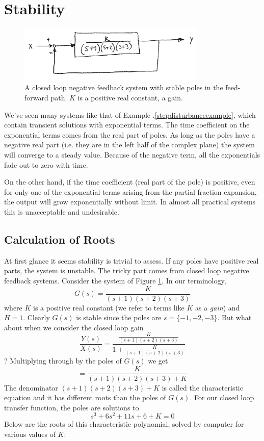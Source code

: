 \section{Stability}\label{FeedbackStabilitySection}


\begin{figure}\centering
\includegraphics[width=3.5in]{figs06/00779a.png}
\caption{A closed loop negative feedback system with stable poles in the feed-forward path. $K$ is a positive real constant, a gain.}\label{openloopstable}
\end{figure}

We've seen many systems like that of Example \thechapter.\ref{stepdisturbanceexample}, which contain transient solutions with exponential terms.
The time coefficient on the exponential terms comes from the real part of poles.
As long as the poles have a negative real part (i.e. they are in the left half of the complex plane)
the system will converge to a steady value.
Because of the negative term, all the exponentials fade out to zero with time.

On the other hand, if the time coefficient (real part of the pole) is positive, even for only one of the exponential terms arising from the partial fraction expansion, the output will grow exponentially without limit.  In almost all practical systems this is unacceptable and undesirable.

\subsection{Calculation of Roots}\label{calculationofroots}

At first glance it seems stability is trivial to assess.  If any poles have positive real parts, the system is unstable.  The tricky part comes from closed loop negative feedback systems.   Consider the system of Figure \ref{openloopstable}.  In our terminology,
\[
G(s) =  \frac  {K}  {(s+1)(s+2)(s+3)}
\]
where $K$ is a positive real constant (we refer to terms like $K$ as a {\it gain}) and $H=1$.
Clearly $G(s)$ is stable since the poles are $s=\{-1, -2, -3\}$.
But what about when we consider the closed loop gain
\[
\frac{Y(s)}{X(s)} =  \frac{\frac{K}{(s+1)(s+2)(s+3)}}  {1+ \frac  {K}  {(s+1)(s+2)(s+3)}}
\]
?
\noindent
Multiplying through by the poles of $G(s)$ we get
\[
= \frac {K}  {(s+1)(s+2)(s+3) + K}
\]
The denominator $(s+1)(s+2)(s+3) + K$ is called the characteristic equation and it has different roots than the poles of $G(s)$.   For our closed loop transfer function, the poles are solutions to
\[
s^3+6s^2+11s+6 +K = 0
\]
Below are the roots of this characteristic polynomial, solved by computer for various values of $K$:

